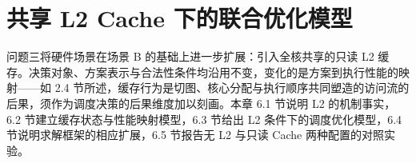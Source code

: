 \section{共享 L2 Cache 下的联合优化模型}\label{sec:q3}

问题三将硬件场景在场景 B 的基础上进一步扩展：引入全核共享的只读 L2 缓存。决策对象、方案表示与合法性条件均沿用不变，变化的是方案到执行性能的映射——如 2.4 节所述，缓存行为是切图、核心分配与执行顺序共同塑造的访问流的后果，须作为调度决策的后果维度加以刻画。本章 6.1 节说明 L2 的机制事实，6.2 节建立缓存状态与性能映射模型，6.3 节给出 L2 条件下的调度优化模型，6.4 节说明求解框架的相应扩展，6.5 节报告无 L2 与只读 Cache 两种配置的对照实验。

